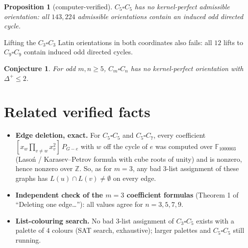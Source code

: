 \documentclass[11pt]{article}
\theoremstyle{plain}
\newtheorem{proposition}[theorem]{Proposition}
\newtheorem{conjecture}[theorem]{Conjecture}
\theoremstyle{definition}
\theoremstyle{remark}
\begin{document}
\begin{proposition}[computer-verified]
$C_5\square C_5$ has no kernel-perfect admissible orientation: all $143{,}224$ admissible
orientations contain an induced odd directed cycle.
\end{proposition}
Lifting the $C_3\square C_3$ Latin orientations in both coordinates also fails: all $12$
lifts to $C_9\square C_9$ contain induced odd directed cycles.

\begin{conjecture}
For odd $m,n\ge5$, $C_m\square C_n$ has no kernel-perfect orientation with $\Delta^+\le2$.
\end{conjecture}

\section{Related verified facts}

\begin{itemize}[leftmargin=1.4em]
\item \textbf{Edge deletion, exact.} For $C_5\square C_5$ and $C_5\square C_7$, every
coefficient $[x_w\prod_{v\ne w}x_v^2]\,P_{G-e}$ with $w$ off the cycle of $e$ was computed
over $\mathbb F_{1000003}$ (Laso\'n / Karasev--Petrov formula with cube roots of unity)
and is nonzero, hence nonzero over $\mathbb Z$. So, as for $m=3$, any bad $3$-list
assignment of these graphs has $L(u)\cap L(v)\ne\emptyset$ on every edge.
\item \textbf{Independent check of the $m=3$ coefficient formulas} (Theorem 1 of
``Deleting one edge\ldots''): all values agree for $n=3,5,7,9$.
\item \textbf{List-colouring search.} No bad $3$-list assignment of $C_3\square C_5$ exists
with a palette of $4$ colours (SAT search, exhaustive); larger palettes and
$C_5\square C_5$ still running.
\end{itemize}
\end{document}
